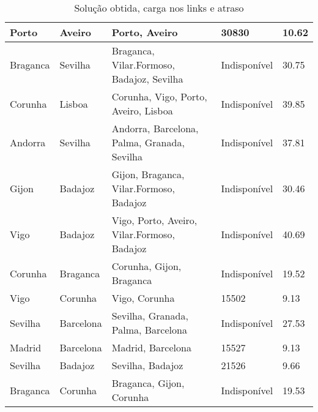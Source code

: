 \begin{table}[!htb]
{\begin{tabular}{|l|l|l|l|l|}
Porto & Aveiro & Porto, Aveiro & 30830 & 10.62 \\ \hline
Braganca & Sevilha & Braganca, Vilar.Formoso, Badajoz, Sevilha & Indisponível & 30.75 \\ \hline
Corunha & Lisboa & Corunha, Vigo, Porto, Aveiro, Lisboa & Indisponível & 39.85 \\ \hline
Andorra & Sevilha & Andorra, Barcelona, Palma, Granada, Sevilha & Indisponível & 37.81 \\ \hline
Gijon & Badajoz & Gijon, Braganca, Vilar.Formoso, Badajoz & Indisponível & 30.46 \\ \hline
Vigo & Badajoz & Vigo, Porto, Aveiro, Vilar.Formoso, Badajoz & Indisponível & 40.69 \\ \hline
Corunha & Braganca & Corunha, Gijon, Braganca & Indisponível & 19.52 \\ \hline
Vigo & Corunha & Vigo, Corunha & 15502 & 9.13 \\ \hline
Sevilha & Barcelona & Sevilha, Granada, Palma, Barcelona & Indisponível & 27.53 \\ \hline
Madrid & Barcelona & Madrid, Barcelona & 15527 & 9.13 \\ \hline
Sevilha & Badajoz & Sevilha, Badajoz & 21526 & 9.66 \\ \hline
Braganca & Corunha & Braganca, Gijon, Corunha & Indisponível & 19.53 \\ \hline
\end{tabular}}
\caption[]{Solução obtida, carga nos links e atraso}
\end{table}

